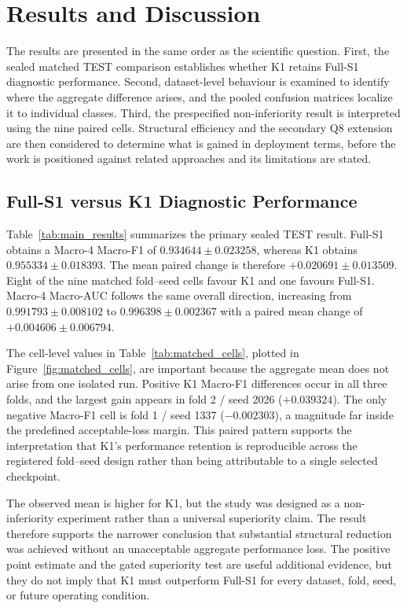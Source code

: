 \section{Results and Discussion}
\label{sec:results}

The results are presented in the same order as the scientific question. First, the sealed matched TEST comparison establishes whether K1 retains Full-S1 diagnostic performance. Second, dataset-level behaviour is examined to identify where the aggregate difference arises, and the pooled confusion matrices localize it to individual classes. Third, the prespecified non-inferiority result is interpreted using the nine paired cells. Structural efficiency and the secondary Q8 extension are then considered to determine what is gained in deployment terms, before the work is positioned against related approaches and its limitations are stated.

\subsection{Full-S1 versus K1 Diagnostic Performance}
\label{subsec:main_results}





Table~\ref{tab:main_results} summarizes the primary sealed TEST result. Full-S1 obtains a Macro-4 Macro-F1 of $0.934644\pm0.023258$, whereas K1 obtains $0.955334\pm0.018393$. The mean paired change is therefore $+0.020691\pm0.013509$. Eight of the nine matched fold--seed cells favour K1 and one favours Full-S1. Macro-4 Macro-AUC follows the same overall direction, increasing from $0.991793\pm0.008102$ to $0.996398\pm0.002367$ with a paired mean change of $+0.004606\pm0.006794$.

The cell-level values in Table~\ref{tab:matched_cells}, plotted in Figure~\ref{fig:matched_cells}, are important because the aggregate mean does not arise from one isolated run. Positive K1 Macro-F1 differences occur in all three folds, and the largest gain appears in fold 2 / seed 2026 ($+0.039324$). The only negative Macro-F1 cell is fold 1 / seed 1337 ($-0.002303$), a magnitude far inside the predefined acceptable-loss margin. This paired pattern supports the interpretation that K1's performance retention is reproducible across the registered fold--seed design rather than being attributable to a single selected checkpoint.

The observed mean is higher for K1, but the study was designed as a non-inferiority experiment rather than a universal superiority claim. The result therefore supports the narrower conclusion that substantial structural reduction was achieved without an unacceptable aggregate performance loss. The positive point estimate and the gated superiority test are useful additional evidence, but they do not imply that K1 must outperform Full-S1 for every dataset, fold, seed, or future operating condition.

